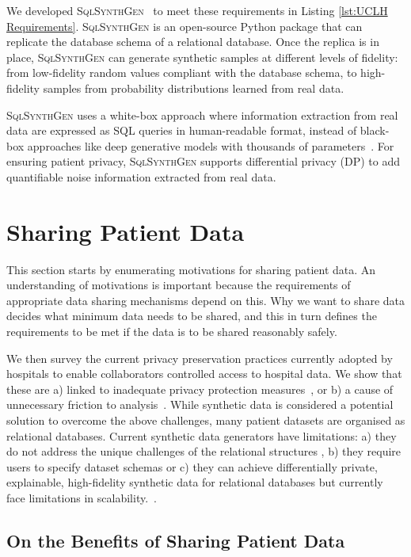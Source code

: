 \documentclass[11pt]{article}
\begin{document}
We developed \textsc{SqlSynthGen}~\cite{repository} to meet these requirements in Listing \ref{lst:UCLH Requirements}. \textsc{SqlSynthGen} is an open-source Python package that can replicate the database schema of a relational database. Once the replica is in place, \textsc{SqlSynthGen} can generate synthetic samples at different levels of fidelity: from low-fidelity random values compliant with the database schema, to high-fidelity samples from probability distributions learned from real data. 

\textsc{SqlSynthGen} uses a white-box approach where information extraction from real data are expressed as SQL queries in human-readable format, instead of black-box approaches like deep generative models with thousands of parameters~\cite{DBLP:journals/pami/Bond-TaylorLLW22}. For ensuring patient privacy, \textsc{SqlSynthGen} supports differential privacy (DP)\cite{DworkR14} to add quantifiable noise information extracted from real data.

\section{Sharing Patient Data}

This section starts by enumerating motivations for sharing patient data. An understanding of motivations is important because the requirements of appropriate data sharing mechanisms depend on this. Why we want to share data decides what minimum data needs to be shared, and this in turn defines the requirements to be met if the data is to be shared reasonably safely.

We then survey the current privacy preservation practices currently adopted by hospitals to enable collaborators controlled access to hospital data.  We show that these are  a) linked to inadequate privacy protection measures~\cite{near2021, tucker2020}, or b) a cause of unnecessary friction to analysis~\cite{ODonovan2023}. While synthetic data is considered a potential solution to overcome the above challenges, many patient datasets are organised as relational databases. Current synthetic data generators have limitations: a) they do not address the unique challenges of the relational structures \cite{Nowok2016}\cite{Synthea2020}, b) they require users to specify dataset schemas \cite{Synth2021} or c) they can achieve differentially private, explainable, high-fidelity synthetic data for relational databases but currently face limitations in scalability.~\cite{Cai2023}.

\subsection{On the Benefits of Sharing Patient Data}
\end{document}
